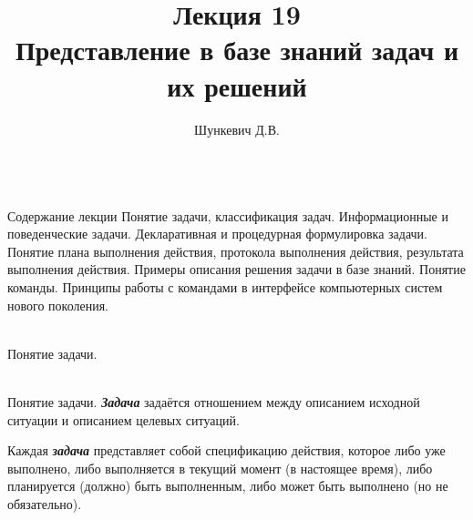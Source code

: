 \title{Лекция 19\\Представление в базе знаний задач и их решений}
\author[]{Шункевич Д.В.}

\begin{frame}
	\titlepage
\end{frame}

\begin{frame}{\\Содержание лекции}
	\topline
	\justifying
	Понятие задачи, классификация задач. Информационные и поведенческие задачи. Декларативная и процедурная формулировка задачи. Понятие плана выполнения действия, протокола выполнения действия, результата выполнения действия. Примеры описания решения задачи в базе знаний. Понятие команды. Принципы работы с командами в интерфейсе компьютерных систем нового поколения. 
\end{frame}

\begin{frame}{\\Понятие задачи.}
	\topline
	\justifying
    \begin{SCn}
    \end{SCn}
\end{frame}

\begin{frame}{\\Понятие задачи.}
	\topline
	\justifying
    \textbf{\textit{Задача}} задаётся отношением  между описанием исходной ситуации и описанием целевых ситуаций.\\
    
    \vspace{0.33cm}
    
    Каждая \textbf{\textit{задача}} представляет собой спецификацию действия, которое либо уже выполнено, либо выполняется в текущий момент (в настоящее время), либо планируется (должно) быть выполненным, либо может быть выполнено (но не обязательно). 
\end{frame}

